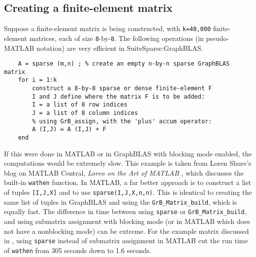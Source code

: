 \documentclass[12pt]{article}
\begin{document}
%


\newpage
\subsection{Creating a finite-element matrix}
\label{fem}

Suppose a finite-element matrix is being constructed, with \verb'k=40,000'
finite-element matrices, each of size \verb'8'-by-\verb'8'.  The following
operations (in pseudo-MATLAB notation) are very efficient in
SuiteSparse:GraphBLAS.

    {\footnotesize
    \begin{verbatim}
    A = sparse (m,n) ; % create an empty n-by-n sparse GraphBLAS matrix
    for i = 1:k
        construct a 8-by-8 sparse or dense finite-element F
        I and J define where the matrix F is to be added:
        I = a list of 8 row indices
        J = a list of 8 column indices
        % using GrB_assign, with the 'plus' accum operator:
        A (I,J) = A (I,J) + F
    end \end{verbatim}}

If this were done in MATLAB or in GraphBLAS with blocking mode enabled, the
computations would be extremely slow.  This example is taken from Loren Shure's
blog on MATLAB Central, {\em Loren on the Art of MATLAB} \cite{Davis07},
which discusses the built-in \verb'wathen' function.  In
MATLAB, a far better approach is to construct a list of tuples \verb'[I,J,X]'
and to use \verb'sparse(I,J,X,n,n)'. This is identical to creating the same
list of tuples in GraphBLAS and using the \verb'GrB_Matrix_build', which is
equally fast.  The difference in time between using \verb'sparse' or
\verb'GrB_Matrix_build', and using submatrix assignment with blocking mode (or
in MATLAB which does not have a nonblocking mode) can be extreme.  For the
example matrix discussed in \cite{Davis07}, using \verb'sparse' instead of
submatrix assignment in MATLAB cut the run time of \verb'wathen' from 305
seconds down to 1.6 seconds.
\end{document}
